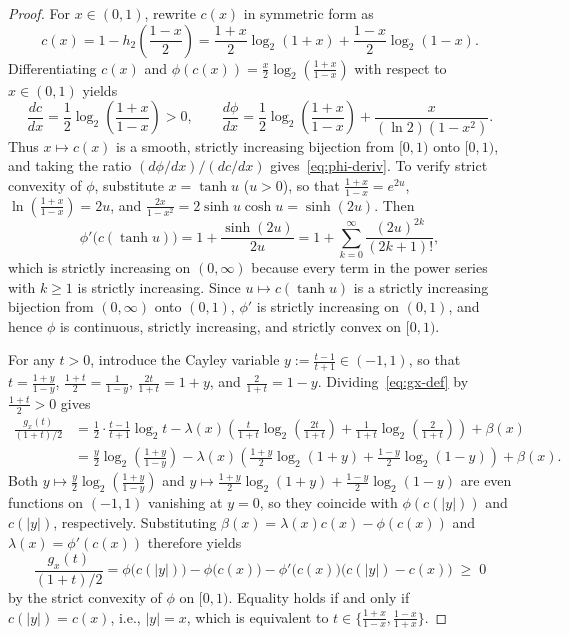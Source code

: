 \documentclass[10pt,a4paper]{article}
\numberwithin{equation}{section}
\theoremstyle{plain}
\theoremstyle{definition}
\theoremstyle{remark}
\begin{document}
\begin{proof}
For $x \in (0,1)$, rewrite $c(x)$ in symmetric form as
\[
c(x) = 1 - h_2\!\left(\frac{1-x}{2}\right) = \frac{1+x}{2}\log_2(1+x) + \frac{1-x}{2}\log_2(1-x).
\]
Differentiating $c(x)$ and $\phi(c(x)) = \frac{x}{2}\log_2(\frac{1+x}{1-x})$ with respect to $x \in (0,1)$ yields
\[
\frac{dc}{dx} = \frac{1}{2}\log_2\!\left(\frac{1+x}{1-x}\right) > 0, \qquad
\frac{d\phi}{dx} = \frac{1}{2}\log_2\!\left(\frac{1+x}{1-x}\right) + \frac{x}{(\ln 2)(1 - x^2)}.
\]
Thus $x \mapsto c(x)$ is a smooth, strictly increasing bijection from $[0,1)$ onto $[0,1)$, and taking the ratio $(d\phi/dx)/(dc/dx)$ gives~\eqref{eq:phi-deriv}. To verify strict convexity of $\phi$, substitute $x = \tanh u$ ($u > 0$), so that $\frac{1+x}{1-x} = e^{2u}$, $\ln(\frac{1+x}{1-x}) = 2u$, and $\frac{2x}{1-x^2} = 2\sinh u \cosh u = \sinh(2u)$. Then
\[
\phi'\bigl(c(\tanh u)\bigr) = 1 + \frac{\sinh(2u)}{2u} = 1 + \sum_{k=0}^{\infty} \frac{(2u)^{2k}}{(2k+1)!},
\]
which is strictly increasing on $(0,\infty)$ because every term in the power series with $k \ge 1$ is strictly increasing. Since $u \mapsto c(\tanh u)$ is a strictly increasing bijection from $(0,\infty)$ onto $(0,1)$, $\phi'$ is strictly increasing on $(0,1)$, and hence $\phi$ is continuous, strictly increasing, and strictly convex on $[0,1)$.

For any $t > 0$, introduce the Cayley variable $y := \frac{t-1}{t+1} \in (-1, 1)$, so that $t = \frac{1+y}{1-y}$, $\frac{1+t}{2} = \frac{1}{1-y}$, $\frac{2t}{1+t} = 1+y$, and $\frac{2}{1+t} = 1-y$. Dividing~\eqref{eq:gx-def} by $\frac{1+t}{2} > 0$ gives
\begin{align*}
\frac{g_x(t)}{(1+t)/2} &= \frac{1}{2}\cdot\frac{t-1}{t+1}\log_2 t - \lambda(x)\left(\frac{t}{1+t}\log_2\!\left(\frac{2t}{1+t}\right) + \frac{1}{1+t}\log_2\!\left(\frac{2}{1+t}\right)\right) + \beta(x)\\
&= \frac{y}{2}\log_2\!\left(\frac{1+y}{1-y}\right) - \lambda(x)\left(\frac{1+y}{2}\log_2(1+y) + \frac{1-y}{2}\log_2(1-y)\right) + \beta(x).
\end{align*}
Both $y \mapsto \frac{y}{2}\log_2(\frac{1+y}{1-y})$ and $y \mapsto \frac{1+y}{2}\log_2(1+y) + \frac{1-y}{2}\log_2(1-y)$ are even functions on $(-1,1)$ vanishing at $y=0$, so they coincide with $\phi(c(\lvert y \rvert))$ and $c(\lvert y \rvert)$, respectively. Substituting $\beta(x) = \lambda(x)c(x) - \phi(c(x))$ and $\lambda(x) = \phi'(c(x))$ therefore yields
\[
\frac{g_x(t)}{(1+t)/2} = \phi\bigl(c(\lvert y \rvert)\bigr) - \phi\bigl(c(x)\bigr) - \phi'\bigl(c(x)\bigr)\bigl(c(\lvert y \rvert) - c(x)\bigr) \;\ge\; 0
\]
by the strict convexity of $\phi$ on $[0,1)$. Equality holds if and only if $c(\lvert y \rvert) = c(x)$, i.e., $\lvert y \rvert = x$, which is equivalent to $t \in \bigl\{\frac{1+x}{1-x}, \frac{1-x}{1+x}\bigr\}$.
\end{proof}
\end{document}
